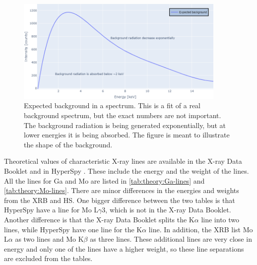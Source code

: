 \begin{figure}[p]
    \centering
    \includegraphics[width=0.9\textwidth]{figures/expected_background.png}
    \caption{
        Expected background in a spectrum.
        This is a fit of a real background spectrum, but the exact numbers are not important.
        The background radiation is being generated exponentially, but at lower energies it is being absorbed.
        The figure is meant to illustrate the shape of the background.
    }
    \label{fig:theory:expected_background}
\end{figure}





Theoretical values of characteristic X-ray lines are available in the X-ray Data Booklet \cite{thompson_x-ray_2004} and in HyperSpy \cite{hyperspy_1.7.1}.
These include the energy and the weight of the lines.
All the lines for Ga and Mo are listed in \cref{tab:theory:Ga-lines} and \cref{tab:theory:Mo-lines}.
There are minor differences in the energies and weights from the XRB and HS.
One bigger difference between the two tables is that HyperSpy have a line for Mo L$\gamma$3, which is not in the X-ray Data Booklet.
Another difference is that the X-ray Data Booklet splits the K$\alpha$ line into two lines, while HyperSpy have one line for the K$\alpha$ line.
In addition, the XRB list Mo L$\alpha$ as two lines and Mo K$\beta$ as three lines.
These additional lines are very close in energy and only one of the lines have a higher weight, so these line separations are excluded from the tables.


